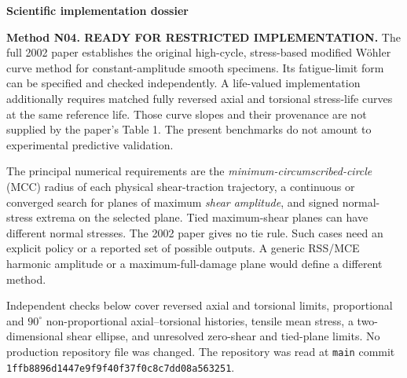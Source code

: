 \documentclass[10pt,a4paper]{article}
\newcommand{\sct}[1]{\needspace{5\baselineskip}\vspace{7pt}{\large\bfseries\color{ink}#1}\par\vspace{2pt}}
\begin{document}
\begin{center}
{\LARGE\bfseries\color{ink}Scientific implementation dossier}\par
\vspace{3pt}{\large Susmel and Lazzarin modified W\"ohler curve, 2002}\par
\vspace{8pt}{\small Independent review for the FABER WG4.3 Numerical Developer  |  19 October 2026}\par
\end{center}

\sct{A  Executive assessment}\label{sec:assessment}
\textbf{Method N04. READY FOR RESTRICTED IMPLEMENTATION.} The full 2002 paper establishes the original high-cycle, stress-based modified W\"ohler curve method for constant-amplitude smooth specimens. Its fatigue-limit form can be specified and checked independently. A life-valued implementation additionally requires matched fully reversed axial and torsional stress-life curves at the same reference life. Those curve slopes and their provenance are not supplied by the paper's Table 1. The present benchmarks do not amount to experimental predictive validation.

The principal numerical requirements are the \emph{minimum-circumscribed-circle} (MCC) radius of each physical shear-traction trajectory, a continuous or converged search for planes of maximum \emph{shear amplitude}, and signed normal-stress extrema on the selected plane. Tied maximum-shear planes can have different normal stresses. The 2002 paper gives no tie rule. Such cases need an explicit policy or a reported set of possible outputs. A generic RSS/MCE harmonic amplitude or a maximum-full-damage plane would define a different method.

Independent checks below cover reversed axial and torsional limits, proportional and $90^\circ$ non-proportional axial--torsional histories, tensile mean stress, a two-dimensional shear ellipse, and unresolved zero-shear and tied-plane limits. No production repository file was changed. The repository was read at \texttt{main} commit \texttt{1ffb8896d1447e9f9f40f37f0c8c7dd08a563251}.
\end{document}
